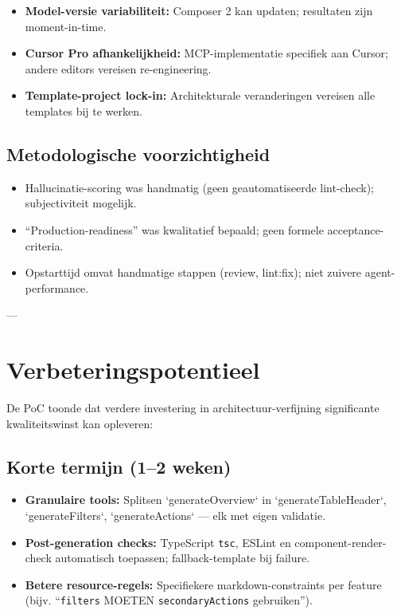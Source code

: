 \begin{itemize}
  \item \textbf{Model-versie variabiliteit:} Composer 2 kan updaten; resultaten zijn moment-in-time.
  
  \item \textbf{Cursor Pro afhankelijkheid:} MCP-implementatie specifiek aan Cursor; andere editors vereisen re-engineering.
  
  \item \textbf{Template-project lock-in:} Architekturale veranderingen vereisen alle templates bij te werken.
\end{itemize}

\subsection{Metodologische voorzichtigheid}

\begin{itemize}
  \item Hallucinatie-scoring was handmatig (geen geautomatiseerde lint-check); subjectiviteit mogelijk.
  
  \item ``Production-readiness'' was kwalitatief bepaald; geen formele acceptance-criteria.
  
  \item Opstarttijd omvat handmatige stappen (review, lint:fix); niet zuivere agent-performance.
\end{itemize}

---

\section{Verbeteringspotentieel}

De PoC toonde dat verdere investering in architectuur-verfijning significante kwaliteitswinst kan opleveren:

\subsection{Korte termijn (1–2 weken)}

\begin{itemize}
  \item \textbf{Granulaire tools:} Splitsen `generateOverview` in `generateTableHeader`, `generateFilters`, `generateActions` — elk met eigen validatie.
  
  \item \textbf{Post-generation checks:} TypeScript \texttt{tsc}, ESLint en component-render-check automatisch toepassen; fallback-template bij failure.
  
  \item \textbf{Betere resource-regels:} Specifiekere markdown-constraints per feature (bijv. ``\texttt{filters} MOETEN \texttt{secondaryActions} gebruiken'').
\end{itemize}

